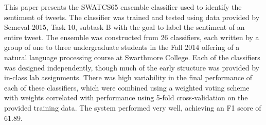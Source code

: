 This paper presents the SWATCS65 ensemble classifier used to identify the sentiment of tweets. The classifier was trained and tested using data provided by Semeval-2015, Task 10, subtask B with the goal to label the sentiment of an entire tweet. The ensemble was constructed from 26 classifiers, each written by a group of one to three undergraduate students in the Fall 2014 offering of a natural language processing course at Swarthmore College. Each of the classifiers was designed independently, though much of the early structure was provided by in-class lab assignments. There was high variability in the final performance of each of these classifiers, which were combined using a weighted voting scheme with weights correlated with performance using 5-fold cross-validation on the provided training data. The system performed very well, achieving an F1 score of 61.89.

